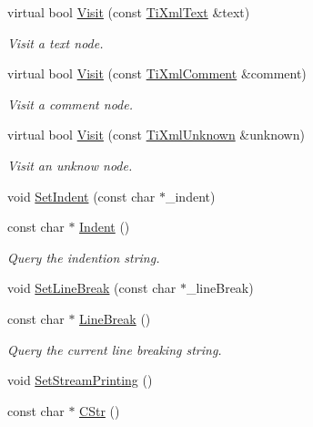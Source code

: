\begin{DoxyCompactItemize}
virtual bool \hyperlink{class_ti_xml_printer_a0857c5d32c59b9a257f9a49cb9411df5}{Visit} (const \hyperlink{class_ti_xml_text}{TiXmlText} \&text)
\begin{DoxyCompactList}\small\item\em Visit a text node. \item\end{DoxyCompactList}\item 
virtual bool \hyperlink{class_ti_xml_printer_a9870423f5603630e6142f6bdb66dfb57}{Visit} (const \hyperlink{class_ti_xml_comment}{TiXmlComment} \&comment)
\begin{DoxyCompactList}\small\item\em Visit a comment node. \item\end{DoxyCompactList}\item 
virtual bool \hyperlink{class_ti_xml_printer_a08591a15c9a07afa83c24e08b03d6358}{Visit} (const \hyperlink{class_ti_xml_unknown}{TiXmlUnknown} \&unknown)
\begin{DoxyCompactList}\small\item\em Visit an unknow node. \item\end{DoxyCompactList}\item 
void \hyperlink{class_ti_xml_printer_a213377a4070c7e625bae59716b089e5e}{SetIndent} (const char $\ast$\_\-indent)
\item 
const char $\ast$ \hyperlink{class_ti_xml_printer_abb33ec7d4bad6aaeb57f4304394b133d}{Indent} ()
\begin{DoxyCompactList}\small\item\em Query the indention string. \item\end{DoxyCompactList}\item 
void \hyperlink{class_ti_xml_printer_a4be1e37e69e3858c59635aa947174fe6}{SetLineBreak} (const char $\ast$\_\-lineBreak)
\item 
const char $\ast$ \hyperlink{class_ti_xml_printer_a11f1b4804a460b175ec244eb5724d96d}{LineBreak} ()
\begin{DoxyCompactList}\small\item\em Query the current line breaking string. \item\end{DoxyCompactList}\item 
void \hyperlink{class_ti_xml_printer_ab23a90629e374cb1cadca090468bbd19}{SetStreamPrinting} ()
\item 
const char $\ast$ \hyperlink{class_ti_xml_printer_a859eede9597d3e0355b77757be48735e}{CStr} ()

\end{DoxyCompactItemize}
